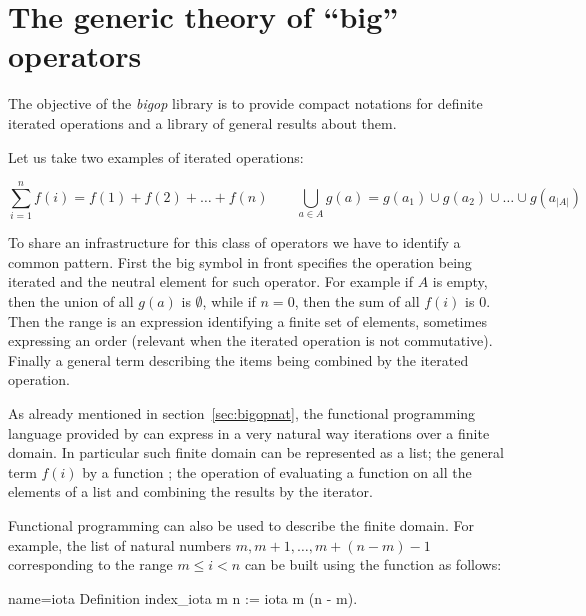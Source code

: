 \section{The generic theory of ``big'' operators}\label{sec:bigop}

The objective of the \emph{bigop} library is to provide compact notations
for definite iterated operations and a library of general results about them.

Let us take two examples of iterated operations:

$$
\sum_{i=1}^n f(i) = f(1) + f(2) + \ldots + f(n)
\qquad \bigcup_{a \in A} g(a) = g(a_1) \cup g(a_2) \cup \ldots \cup g(a_{|A|})
$$

To share an infrastructure for this class of operators we have to
identify a common pattern.  First the big symbol in front specifies the
operation being iterated and the neutral element for such operator.
For example if $A$ is empty, then the union of all $g(a)$ is $\emptyset$,
while if $n=0$, then the sum of all $f(i)$ is $0$.
Then the range is an expression identifying a finite set of elements,
sometimes expressing an order (relevant when the iterated operation is not
commutative).  Finally a general term describing the
items being combined by the iterated operation.

As already mentioned in section~\ref{sec:bigopnat},
the functional programming language
provided by \Coq{} can express in a very natural way iterations over
a finite domain.  In particular such finite domain can be represented
as a list; the general term $f(i)$ by a function ; the operation of evaluating a function on all the
elements of a list and combining the results by the  iterator.

Functional programming can also be used to describe the finite domain.
For example, the list of natural numbers $m, m+1, \ldots, m + (n - m) - 1$
corresponding to the range $m \leq i < n$ can be built using the 
function as follows:
\begin{coq}{name=iota}{}
Definition index_iota m n := iota m (n - m).
\end{coq}


